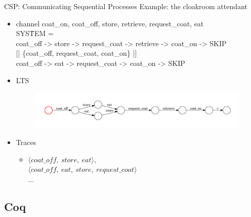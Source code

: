\documentclass[t]{beamer}
\begin{document}
\begin{frame}{CSP: Communicating Sequential Processes}
	Example: the cloakroom attendant\\[2ex]
	\begin{itemize}
		\item \CSPM{}
		\ttfamily
		\scriptsize
		\begin{tabbing}
			channel coat\_on, coat\_off, store, retrieve, request\_coat, eat\\
			SYS\=TEM =\\
			\>	coat\_off -> store -> request\_coat -> retrieve -> coat\_on -> SKIP\\
			\>	{[| \{coat\_off, request\_coat, coat\_on\} |]}\\
			\>	coat\_off -> eat -> request\_coat -> coat\_on -> SKIP
		\end{tabbing}
		\normalfont
		\normalsize

		\vskip 0.1in
		\item LTS
		\begin{figure}
			\includegraphics[scale=0.3]{figures/LTS.pdf}
		\end{figure}

		\item Traces
		\begin{itemize}
			\item $ \langle \mathit{coat\_off,\ store,\ eat} \rangle, $ \\
			$ \langle \mathit{coat\_off,\ eat,\ store,\ request\_coat} \rangle $\\
			$\ldots$
		\end{itemize}
	\end{itemize}
\end{frame}

\subsection{Coq}
\end{document}

